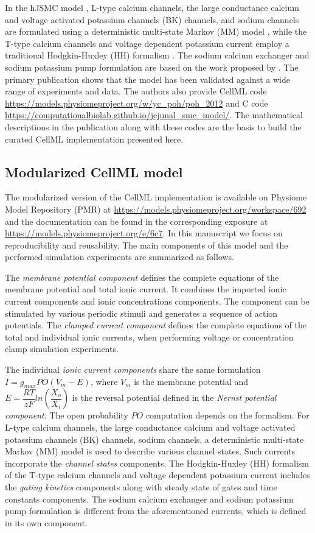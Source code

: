 \documentclass[fleqn,10pt]{physiome}
\begin{document}
In the hJSMC model \citep{poh2012quantitative}, L-type calcium channels, the large conductance calcium and voltage activated potassium channels (BK) channels, and sodium channels are formulated using a deterministic multi-state Markov (MM) model \citep{19961078}, while the T-type calcium channels and voltage dependent potassium current employ a traditional Hodgkin-Huxley (HH) formalism \citep{hodgkin1952quantitative}. The sodium calcium exchanger and sodium potassium pump formulation are based on the work proposed by \citet{ten2004model}. The primary publication shows that the model has been validated against a wide range of experiments and data. The authors also provide CellML code \url{https://models.physiomeproject.org/w/yc_poh/poh_2012} and C code \url{https://computationalbiolab.github.io/jejunal_smc_model/}. The mathematical descriptions in the publication \citep{poh2012quantitative} along with these codes are the basis to build the curated CellML implementation presented here.

\subsection{Modularized CellML model}
The modularized version of the CellML implementation is available on Physiome Model Repository (PMR) at \url{https://models.physiomeproject.org/workspace/692} and the documentation can be found in the corresponding exposure at \url{https://models.physiomeproject.org/e/6c7}. In this manuscript we focus on reproducibility and reusability. The main components of this model and the performed simulation experiments are summarized as follows.

The \emph{membrane potential component} defines the complete equations of the membrane potential and total ionic current. It combines the imported ionic current components and ionic concentrations components. The component can be stimulated by various periodic stimuli and generates a sequence of action potentials. The \emph{clamped current component} defines the complete equations of the total and individual ionic currents, when performing voltage or concentration clamp simulation experiments.

The individual \emph{ionic current components} share the same formulation $I=g_{max}PO(V_m-E)$, where $V_m$ is the membrane potential and $E=\dfrac{RT}{zF}ln\left(\dfrac{X_o}{X_i} \right)$ is the reversal potential defined in the \emph{Nernst potential component}. The open probability $PO$ computation depends on the formalism. For L-type calcium channels, the large conductance calcium and voltage activated potassium channels (BK) channels, sodium channels, a deterministic multi-state Markov (MM) model \citep{19961078} is used to describe various channel states. Such currents incorporate the \emph{channel states} components. The Hodgkin-Huxley (HH) formalism of the T-type calcium channels and voltage dependent potassium current includes the \emph{gating kinetics} components along with steady state of gates and time constants components. The sodium calcium exchanger and sodium potassium pump formulation is different from the aforementioned currents, which is defined in its own component.
\end{document}
